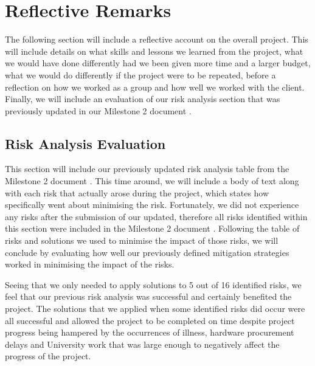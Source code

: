     
    \section{Reflective Remarks}

        The following section will include a reflective account on the overall project. This will include details on what skills and lessons we learned from the project, what we would have done differently had we been given more time and a larger budget, what we would do differently if the project were to be repeated, before a reflection on how we worked as a group and how well we worked with the client. Finally, we will include an evaluation of our risk analysis section that was previously updated in our Milestone 2 document \cite{mile2}.

        \subsection{Risk Analysis Evaluation}
        \label{subsec:risk}

            This section will include our previously updated risk analysis table from the Milestone 2 document \cite{mile2}. This time around, we will include a body of text along with each risk that actually arose during the project, which states how specifically went about minimising the risk. Fortunately, we did not experience any risks after the submission of our updated, therefore all risks identified within this section were included in the Milestone 2 document \cite{mile2}. Following the table of risks and solutions we used to minimise the impact of those risks, we will conclude by evaluating how well our previously defined mitigation strategies worked in minimising the impact of the risks.

            \afterpage{%
                \clearpage%
                \thispagestyle{empty}%
                \begin{landscape}%
                    \centering %
                    
                \end{landscape}
                \clearpage%
            }

            Seeing that we only needed to apply solutions to 5 out of 16 identified risks, we feel that our previous risk analysis was successful and certainly benefited the project. The solutions that we applied when some identified risks did occur were all successful and allowed the project to be completed on time despite project progress being hampered by the occurrences of illness, hardware procurement delays and University work that was large enough to negatively affect the progress of the project. 

